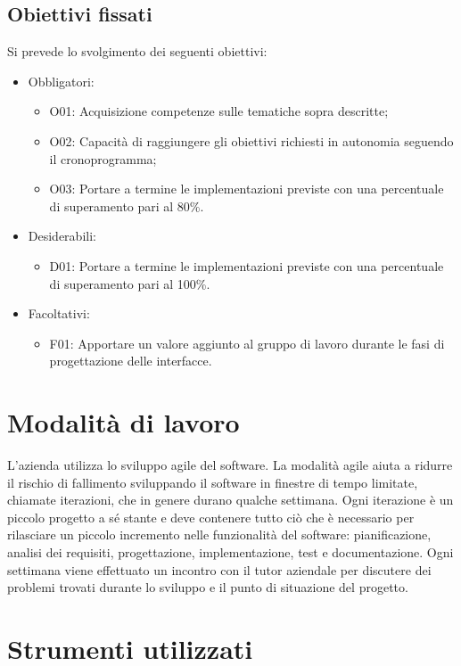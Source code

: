\subsection{Obiettivi fissati}
Si prevede lo svolgimento dei seguenti obiettivi:
\begin{itemize}
    \item Obbligatori:
    \begin{itemize}
        \item O01: Acquisizione competenze sulle tematiche sopra descritte;
        \item O02: Capacità di raggiungere gli obiettivi richiesti in autonomia seguendo il cronoprogramma;
        \item O03: Portare a termine le implementazioni previste con una percentuale di superamento pari al 80\%.        
    \end{itemize}
    \item Desiderabili:
     \begin{itemize}
        \item D01: Portare a termine le implementazioni previste con una percentuale di superamento pari al 100\%.
     \end{itemize}
     \item Facoltativi:
     \begin{itemize}
        \item F01: Apportare un valore aggiunto al gruppo di lavoro durante le fasi di progettazione delle interfacce.
     \end{itemize}
\end{itemize}


\section{Modalità di lavoro}
L'azienda utilizza lo sviluppo agile del software. La modalità agile aiuta a ridurre il rischio di fallimento sviluppando il software in finestre di tempo limitate, chiamate iterazioni, che in genere durano qualche settimana. Ogni iterazione è un piccolo progetto a sé stante e deve contenere tutto ciò che è necessario per rilasciare un piccolo incremento nelle funzionalità del software: pianificazione, analisi dei requisiti, progettazione, implementazione, test e documentazione. Ogni settimana viene effettuato un incontro con il tutor aziendale per discutere dei problemi trovati durante lo sviluppo e il punto di situazione del progetto.

\section{Strumenti utilizzati}
